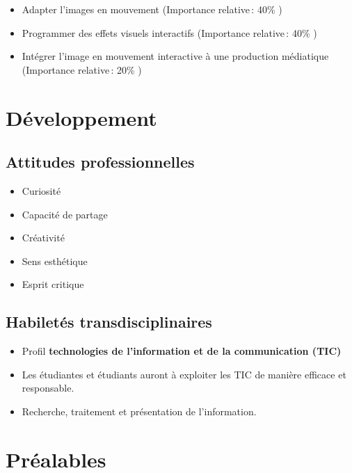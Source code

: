 \documentclass[
]{book}
\providecommand{\tightlist}{%
  \setlength{\itemsep}{0pt}\setlength{\parskip}{0pt}}
\begin{document}
\begin{itemize}
\tightlist
\item
  Adapter l'images en mouvement (Importance relative\,: 40\% )
\item
  Programmer des effets visuels interactifs (Importance relative\,: 40\% )
\item
  Intégrer l'image en mouvement interactive à une production médiatique (Importance relative\,: 20\% )
\end{itemize}

\hypertarget{duxe9veloppement}{%
\section{Développement}\label{duxe9veloppement}}

\hypertarget{attitudes-professionnelles}{%
\subsection{Attitudes professionnelles}\label{attitudes-professionnelles}}

\begin{itemize}
\tightlist
\item
  Curiosité
\item
  Capacité de partage
\item
  Créativité
\item
  Sens esthétique
\item
  Esprit critique
\end{itemize}

\hypertarget{habiletuxe9s-transdisciplinaires}{%
\subsection{Habiletés transdisciplinaires}\label{habiletuxe9s-transdisciplinaires}}

\begin{itemize}
\tightlist
\item
  Profil \textbf{technologies de l'information et de la communication (TIC)}
\item
  Les étudiantes et étudiants auront à exploiter les TIC de manière efficace et responsable.
\item
  Recherche, traitement et présentation de l'information.
\end{itemize}

\hypertarget{pruxe9alables}{%
\section{Préalables}\label{pruxe9alables}}
\end{document}
